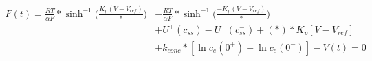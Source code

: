 \documentclass[10pt]{article}
\begin{document}
\begin{align*}F(t) = \frac{RT}{\alpha F}*\sinh^{-1}\Big(\frac{K_p(V-V_{ref})}{*}\Big) &- \frac{RT}{\alpha F}*\sinh^{-1}\Big(\frac{-K_p(V-V_{ref})}{*}\Big) \\
&+ U^+(c_{ss}^+) - U^-(c_{ss}^-) + (*)*K_p[V-V_{ref}] \\
&+ k_{conc}*[\ln c_e(0^+) - \ln c_e(0^-)] - V(t) = 0
\end{align*}
\end{document}
